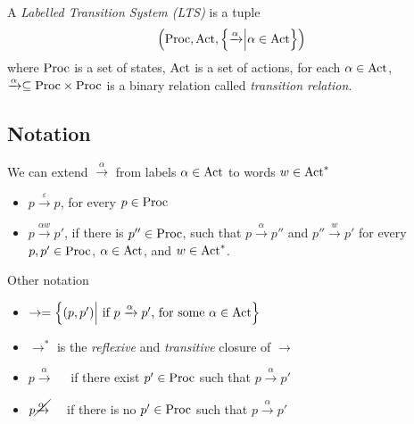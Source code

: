 \begin{definition}
	A \emph{Labelled Transition System (LTS)} is a tuple
	\[
		\left(\textnormal{Proc},\textnormal{Act},\left\lbrace\xrightarrow{\alpha} \middle\vert \alpha\in\textnormal{Act}\right\rbrace\right)
	\]
	where $ \textnormal{Proc} $ is a set of states, $ \textnormal{Act} $ is a set of actions, for each $ \alpha\in\textnormal{Act} $, $ \xrightarrow{\alpha} \subseteq \textnormal{Proc}\times\textnormal{Proc} $ is a binary relation called \emph{transition relation}.
\end{definition}
\subsection*{Notation}
We can extend $ \xrightarrow{\alpha} $ from labels $ \alpha\in\textnormal{Act} $ to words $ w\in\textnormal{Act}^* $
\begin{itemize}
	\item $ p\xrightarrow{\varepsilon}p $, for every $ p\in\textnormal{Proc} $
	\item $ p\xrightarrow{\alpha w}p' $, if there is $ p''\in\textnormal{Proc} $, such that $ p\xrightarrow{\alpha}p'' $ and $ p''\xrightarrow{w}p' $ for every $ p,p'\in\textnormal{Proc} $, $ \alpha\in\textnormal{Act} $, and $ w\in\textnormal{Act}^* $.
\end{itemize}
Other notation
\begin{itemize}
	\item $ \rightarrow = \left\lbrace(p,p')\middle\vert \text{ if } p\xrightarrow{\alpha}p'\text{, for some } \alpha\in\textnormal{Act}\right\rbrace$
	\item $ \rightarrow^* $ is the \emph{reflexive} and \emph{transitive} closure of $ \rightarrow $
	\item $ p\xrightarrow{\alpha} $~~ if there exist $ p'\in\textnormal{Proc} $ such that $ p\xrightarrow{\alpha}p' $
	\item $ p\cancel{\xrightarrow{\alpha}} $~~ if there is no $ p'\in\textnormal{Proc} $ such that $ p\xrightarrow{\alpha}p' $
\end{itemize}